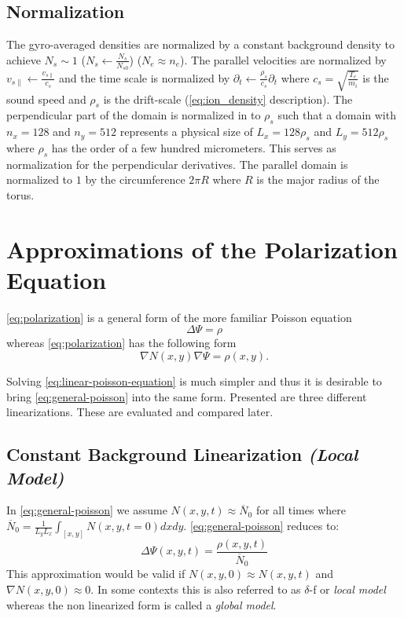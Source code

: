 \documentclass[master.tex]{subfiles}
\begin{document}
\subsection{Normalization}
The gyro-averaged densities are normalized by a constant background density to achieve $N_s \sim 1$ ($N_s \leftarrow \frac{N_s}{N_{s0}}$) ($N_e \approx n_e$). The parallel velocities are normalized by $v_{s\parallel} \leftarrow \frac{v_{s\parallel}}{c_s}$ and the time scale is normalized by $\partial_t \leftarrow \frac{\rho_s}{c_s}\partial_t$ where $c_s = \sqrt{\frac{T_e}{m_i}}$ is the sound speed and $\rho_s$ is the drift-scale (\autoref{eq:ion_density} description). The perpendicular part of the domain is normalized in to $\rho_s$ such that a domain with $n_x=128$ and $n_y=512$ represents a physical size of $L_x=128\rho_s$ and $L_y=512\rho_s$ where $\rho_s$ has the order of a few hundred micrometers. This serves as normalization for the perpendicular derivatives. The parallel domain is normalized to $1$ by the circumference $2\pi R$ where $R$ is the major radius of the torus.


\section{Approximations of the Polarization Equation} \label{sec:polarization-linearizations}
\autoref{eq:polarization} is a general form of the more familiar Poisson equation
\begin{equation}\label{eq:linear-poisson-equation}
    \Delta \Psi = \rho 
\end{equation}
whereas \autoref{eq:polarization} has the following form
\begin{equation}\label{eq:general-poisson}
    \nabla N(x,y) \nabla \Psi = \rho(x,y).
\end{equation}

Solving \autoref{eq:linear-poisson-equation} is much simpler and thus it is desirable to bring \autoref{eq:general-poisson} into the same form. Presented are three different linearizations. These are evaluated and compared later.

\subsection{Constant Background Linearization \textit{(Local Model)}}

In \autoref{eq:general-poisson} we assume $N(x,y, t) \approx \overline{N}_0$ for all times where $\overline{N}_0=\frac{1}{L_yL_x}\int_{[x,y]} N(x,y, t = 0) dx dy$. \autoref{eq:general-poisson} reduces to:
\begin{equation}
    \Delta \Psi(x,y,t) = \frac{\rho(x,y,t)}{\overline{N}_0}
\end{equation}
This approximation would be valid if $N(x,y, 0) \approx N(x,y,t)$ and $\nabla N(x,y,0) \approx 0$. In some contexts this is also referred to as  $\delta$-f or \textit{local model} whereas the non linearized form is called a \textit{global model}.
\end{document}
